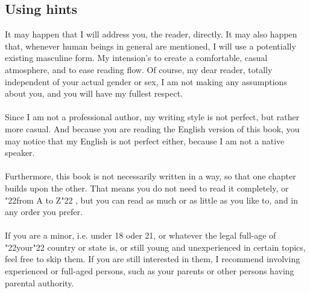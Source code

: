 \documentclass[12pt,a5paper]{article}
\newcommand{\q}[1]{\char"22{#1}\char"22 }
\begin{document}
	\newpage
	\subsection{Using hints}
		It may happen that I will address you,
		the reader,
		directly.
		It may also happen that,
		whenever human beings in general are mentioned,
		I will use a potentially existing masculine form.
		My intension's to create a comfortable,
		casual atmosphere,
		and to ease reading flow.
		Of course,
		my dear reader,
		totally independent of your actual gender or sex,
		I am not making any assumptions about you,
		and you will have my fullest respect.
		\\
		\\
		Since I am not a professional author,
		my writing style is not perfect,
		but rather more casual.
		And because you are reading the English version of this book,
		you may notice that my English is not perfect either,
		because I am not a native speaker.
		\\
		\\
		Furthermore,
		this book is not necessarily written in a way,
		so that one chapter builds upon the other.
		That means you do not need to read it completely,
		or \q{from A to Z},
		but you can read as much or as little as you like to,
		and in any order you prefer.
		\\
		\\
		If you are a minor,
		i.e. under 18 oder 21,
		or whatever the legal full-age of \q{your} country or state is,
		or still young and unexperienced in certain topics,
		feel free to skip them.
		If you are still interested in them,
		I recommend involving experienced or full-aged persons,
		such as your parents or other persons having parental authority.
	
	\newpage
\end{document}

